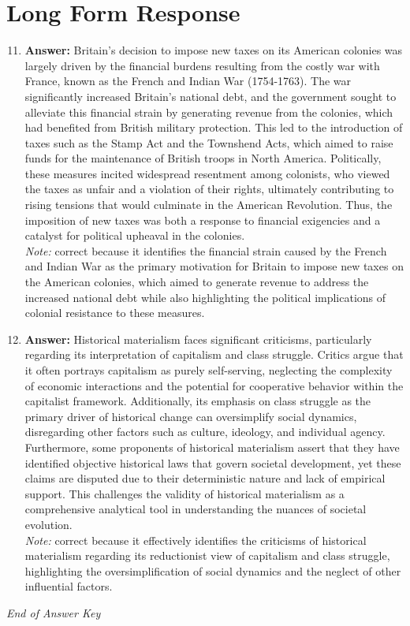 \documentclass[12pt]{article}
\begin{document}
\section*{Long Form Response}
\begin{enumerate}[label=\arabic*.]
\setcounter{enumi}{10}
\item \textbf{Answer:} Britain's decision to impose new taxes on its American colonies was largely driven by the financial burdens resulting from the costly war with France, known as the French and Indian War (1754-1763). The war significantly increased Britain's national debt, and the government sought to alleviate this financial strain by generating revenue from the colonies, which had benefited from British military protection. This led to the introduction of taxes such as the Stamp Act and the Townshend Acts, which aimed to raise funds for the maintenance of British troops in North America. Politically, these measures incited widespread resentment among colonists, who viewed the taxes as unfair and a violation of their rights, ultimately contributing to rising tensions that would culminate in the American Revolution. Thus, the imposition of new taxes was both a response to financial exigencies and a catalyst for political upheaval in the colonies.
\\ \textit{Note:} correct because it identifies the financial strain caused by the French and Indian War as the primary motivation for Britain to impose new taxes on the American colonies, which aimed to generate revenue to address the increased national debt while also highlighting the political implications of colonial resistance to these measures.
\item \textbf{Answer:} Historical materialism faces significant criticisms, particularly regarding its interpretation of capitalism and class struggle. Critics argue that it often portrays capitalism as purely self-serving, neglecting the complexity of economic interactions and the potential for cooperative behavior within the capitalist framework. Additionally, its emphasis on class struggle as the primary driver of historical change can oversimplify social dynamics, disregarding other factors such as culture, ideology, and individual agency. Furthermore, some proponents of historical materialism assert that they have identified objective historical laws that govern societal development, yet these claims are disputed due to their deterministic nature and lack of empirical support. This challenges the validity of historical materialism as a comprehensive analytical tool in understanding the nuances of societal evolution.
\\ \textit{Note:} correct because it effectively identifies the criticisms of historical materialism regarding its reductionist view of capitalism and class struggle, highlighting the oversimplification of social dynamics and the neglect of other influential factors.
\end{enumerate}

\vfill
\noindent\textit{End of Answer Key}
\end{document}

